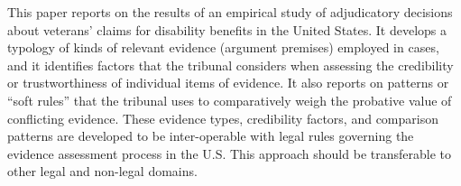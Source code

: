 This paper reports on the results of an empirical study of adjudicatory decisions about veterans' claims for disability benefits in the United States. It develops a typology of kinds of relevant evidence (argument premises) employed in cases, and it identifies factors that the tribunal considers when assessing the credibility or trustworthiness of individual items of evidence. It also reports on patterns or ``soft rules'' that the tribunal uses to comparatively weigh the probative value of conflicting evidence. These evidence types, credibility factors, and comparison patterns are developed to be inter-operable with legal rules governing the evidence assessment process in the U.S. This approach should be transferable to other legal and non-legal domains.
